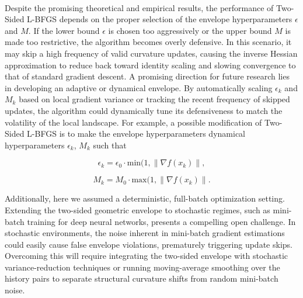 \documentclass[twoside,11pt]{article}
\begin{document}
\\
Despite the promising theoretical and empirical results, the performance of Two-Sided L-BFGS depends on the proper selection of the envelope hyperparameters $\epsilon$ and $M$. If the lower bound $\epsilon$ is chosen too aggressively or the upper bound $M$ is made too restrictive, the algorithm becomes overly defensive. In this scenario, it may skip a high frequency of valid curvature updates, causing the inverse Hessian approximation to reduce back toward identity scaling and slowing convergence to that of standard gradient descent. A promising direction for future research lies in developing an adaptive or dynamical envelope. By automatically scaling $\epsilon_k$ and $M_k$ based on local gradient variance or tracking the recent frequency of skipped updates, the algorithm could dynamically tune its defensiveness to match the volatility of the local landscape. For example, a possible modification of Two-Sided L-BFGS is to make the envelope hyperparameters dynamical hyperparameters $\epsilon_k$, $M_k$ such that

\[
\epsilon_k = \epsilon_0 \cdot \text{min}(1, \|\nabla f(x_k)\|,
\]

\[
M_k = M_0 \cdot \text{max}(1, \|\nabla f(x_k)\|.
\]

\noindent
Additionally, here we assumed a deterministic, full-batch optimization setting. Extending the two-sided geometric envelope to stochastic regimes, such as mini-batch training for deep neural networks, presents a compelling open challenge. In stochastic environments, the noise inherent in mini-batch gradient estimations could easily cause false envelope violations, prematurely triggering update skips. Overcoming this will require integrating the two-sided envelope with stochastic variance-reduction techniques or running moving-average smoothing over the history pairs to separate structural curvature shifts from random mini-batch noise.

\end{document}
